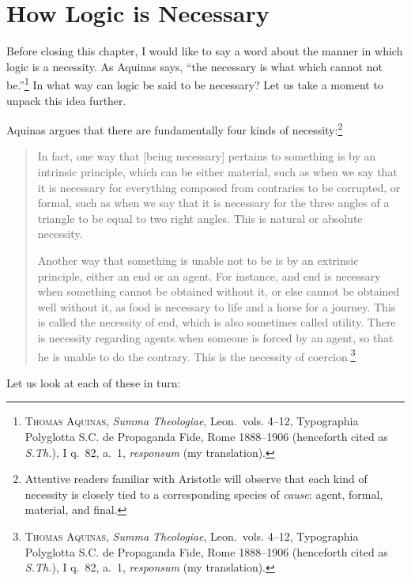\documentclass[
  12pt,
]{memoir}
\begin{document}
\section{How Logic is Necessary}\label{how-logic-is-necessary}

Before closing this chapter, I would like to say a word about the manner
in which logic is a necessity. As Aquinas says, ``the necessary is what
which cannot not be.''\footnote{\textsc{Thomas Aquinas}, \emph{Summa
  Theologiae}, Leon.~vols. 4--12, Typographia Polyglotta S.C. de
  Propaganda Fide, Rome 1888--1906 (henceforth cited as \emph{S.Th.}), I
  q.~82, a.~1, \emph{responsum} (my translation).} In what way can logic
be said to be necessary? Let us take a moment to unpack this idea
further.

Aquinas argues that there are fundamentally four kinds of
necessity:\footnote{Attentive readers familiar with Aristotle will
  observe that each kind of necessity is closely tied to a corresponding
  species of \emph{cause}: agent, formal, material, and final.}

\begin{quote}
In fact, one way that {[}being necessary{]} pertains to something is by
an intrinsic principle, which can be either material, such as when we
say that it is necessary for everything composed from contraries to be
corrupted, or formal, such as when we say that it is necessary for the
three angles of a triangle to be equal to two right angles. This is
natural or absolute necessity.

Another way that something is unable not to be is by an extrinsic
principle, either an end or an agent. For instance, and end is necessary
when something cannot be obtained without it, or else cannot be obtained
well without it, as food is necessary to life and a horse for a journey.
This is called the necessity of end, which is also sometimes called
utility. There is necessity regarding agents when someone is forced by
an agent, so that he is unable to do the contrary. This is the necessity
of coercion.\footnote{\textsc{Thomas Aquinas}, \emph{Summa Theologiae},
  Leon.~vols. 4--12, Typographia Polyglotta S.C. de Propaganda Fide,
  Rome 1888--1906 (henceforth cited as \emph{S.Th.}), I q.~82, a.~1,
  \emph{responsum} (my translation).}
\end{quote}

Let us look at each of these in turn:
\end{document}
